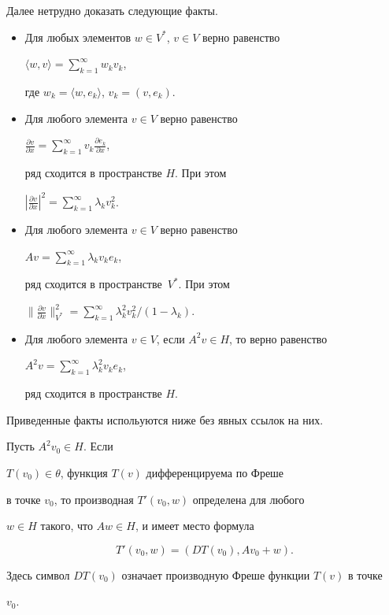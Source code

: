 Далее нетрудно доказать следующие факты.


\begin{itemize}


\item[1.] Для любых элементов $w\in V^*$, $v\in V$ верно равенство


$\langle w,v\rangle= \sum\limits_{k=1}^\infty  w_kv_k$,


где $w_k=\langle w,e_k\rangle$, $v_k=(v,e_k)$.


\item[2.] Для любого элемента $v\in V$ верно равенство 


$\frac{\partial {v} }{\partial x} = \sum\limits_{k=1}^\infty  


v_k \frac{\partial {e_k} }{\partial x}$,


ряд сходится в пространстве $H$. При этом 


$|\frac{\partial {v} }{\partial x} |^2=


\sum\limits_{k=1}^\infty \lambda_k v_k^2$.


\item[3.] Для любого элемента $v\in V$ верно равенство


$Av= \sum\limits_{k=1}^\infty \lambda_k v_ke_k$,


ряд сходится в пространстве~$V^*$. При этом 


$\| \frac{\partial {v}}{\partial x} \|^2_{V^*}=


\sum\limits_{k=1}^\infty \lambda_k^2v_k^2/(1-\lambda_k)$.


\item[4.] Для любого элемента $v\in V$, если $A^2v\in H$, то верно равенство


$A^2v= \sum\limits_{k=1}^\infty \lambda_k^2v_ke_k$,


ряд сходится в пространстве $H$.


\end{itemize}





Приведенные факты испольуются ниже без явных ссылок на них.





\begin{lem}


Пусть $A^2v_0\in H$. Если


$T(v_0)\in\theta$, функция $T(v)$ дифференцируема по Фреше


в точке $v_0$, то производная $T'(v_0,w)$ определена для любого


$w\in H$ такого, что $Aw\in H$, и имеет место формула


\begin{equation}  \label{DT}


T'(v_0,w)=(DT(v_0),Av_0+w).


\end{equation}


Здесь символ $DT(v_0)$ означает производную Фреше функции $T(v)$  в точке


$v_0$.


\end{lem}





